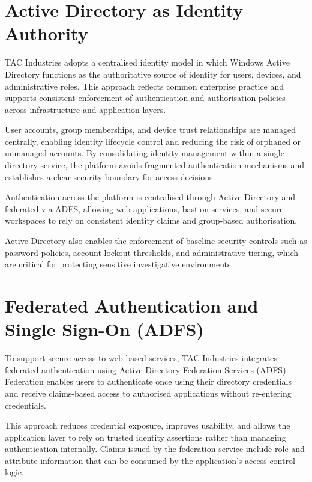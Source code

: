 \section{Active Directory as Identity Authority}

TAC Industries adopts a centralised identity model in which Windows Active Directory functions as the authoritative source of identity for users, devices, and administrative roles. This approach reflects common enterprise practice and supports consistent enforcement of authentication and authorisation policies across infrastructure and application layers.

User accounts, group memberships, and device trust relationships are managed centrally, enabling identity lifecycle control and reducing the risk of orphaned or unmanaged accounts. By consolidating identity management within a single directory service, the platform avoids fragmented authentication mechanisms and establishes a clear security boundary for access decisions.

Authentication across the platform is centralised through Active Directory and federated via ADFS, allowing web applications, bastion services, and secure workspaces to rely on consistent identity claims and group-based authorisation.

Active Directory also enables the enforcement of baseline security controls such as password policies, account lockout thresholds, and administrative tiering, which are critical for protecting sensitive investigative environments.

\section{Federated Authentication and Single Sign-On (ADFS)}

To support secure access to web-based services, TAC Industries integrates federated authentication using Active Directory Federation Services (ADFS). Federation enables users to authenticate once using their directory credentials and receive claims-based access to authorised applications without re-entering credentials\cite{windowsServer}.

This approach reduces credential exposure, improves usability, and allows the application layer to rely on trusted identity assertions rather than managing authentication internally. Claims issued by the federation service include role and attribute information that can be consumed by the application’s access control logic\cite{windowsServer}.

